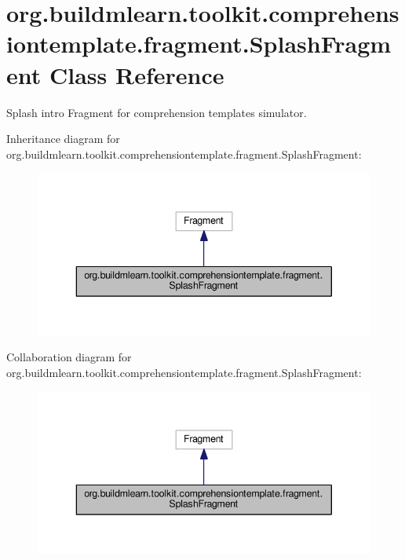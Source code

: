 \hypertarget{classorg_1_1buildmlearn_1_1toolkit_1_1comprehensiontemplate_1_1fragment_1_1SplashFragment}{}\section{org.\+buildmlearn.\+toolkit.\+comprehensiontemplate.\+fragment.\+Splash\+Fragment Class Reference}
\label{classorg_1_1buildmlearn_1_1toolkit_1_1comprehensiontemplate_1_1fragment_1_1SplashFragment}


Splash intro Fragment for comprehension template\textquotesingle{}s simulator.  




Inheritance diagram for org.\+buildmlearn.\+toolkit.\+comprehensiontemplate.\+fragment.\+Splash\+Fragment\+:
\nopagebreak
\begin{figure}[H]
\begin{center}
\leavevmode
\includegraphics[width=343pt]{classorg_1_1buildmlearn_1_1toolkit_1_1comprehensiontemplate_1_1fragment_1_1SplashFragment__inherit__graph}
\end{center}
\end{figure}


Collaboration diagram for org.\+buildmlearn.\+toolkit.\+comprehensiontemplate.\+fragment.\+Splash\+Fragment\+:
\nopagebreak
\begin{figure}[H]
\begin{center}
\leavevmode
\includegraphics[width=343pt]{classorg_1_1buildmlearn_1_1toolkit_1_1comprehensiontemplate_1_1fragment_1_1SplashFragment__coll__graph}
\end{center}
\end{figure}
